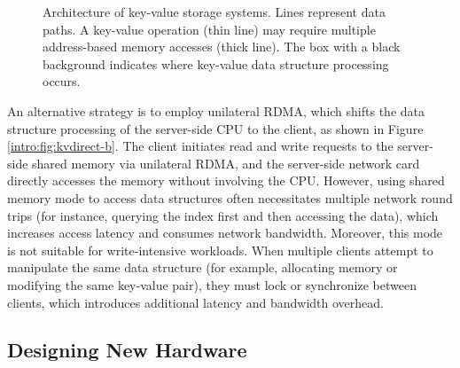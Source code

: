 \begin{figure}[t]
	\centering
	\caption{Architecture of key-value storage systems. Lines represent data paths. A key-value operation (thin line) may require multiple address-based memory accesses (thick line). The box with a black background indicates where key-value data structure processing occurs.}
	\label{intro:fig:kvdirect}
\end{figure}

An alternative strategy is to employ unilateral RDMA, which shifts the data structure processing of the server-side CPU to the client, as shown in Figure \ref{intro:fig:kvdirect-b}. The client initiates read and write requests to the server-side shared memory via unilateral RDMA, and the server-side network card directly accesses the memory without involving the CPU. However, using shared memory mode to access data structures often necessitates multiple network round trips (for instance, querying the index first and then accessing the data), which increases access latency and consumes network bandwidth. Moreover, this mode is not suitable for write-intensive workloads. When multiple clients attempt to manipulate the same data structure (for example, allocating memory or modifying the same key-value pair), they must lock or synchronize between clients, which introduces additional latency and bandwidth overhead.

\subsection{Designing New Hardware}

